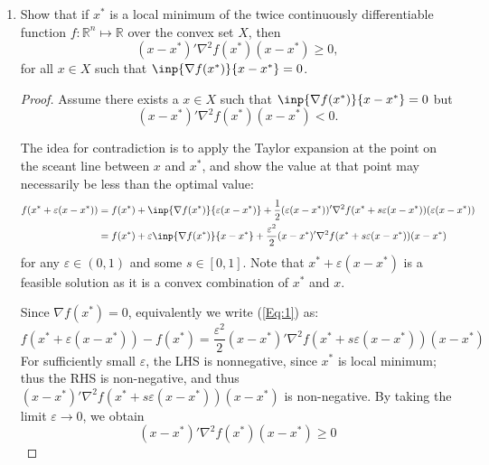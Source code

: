 \begin{enumerate}
\item
Show that if $x^*$ is a local minimum of the twice continuously differentiable function $f:\mathbb{R}^n\mapsto\mathbb{R}$ over the convex set $X$, then
\[
(x-x^*)'\nabla^2f(x^*)(x-x^*)\ge0,
\]
for all $x\in X$ such that $\inp{\nabla f(x^*)}{x-x^*}=0$.
\begin{proof}
Assume there exists a $x\in X$ such that $\inp{\nabla f(x^*)}{x-x^*}=0$ but 
\[
(x-x^*)'\nabla^2f(x^*)(x-x^*)<0.
\]

The idea for contradiction is to apply the Taylor expansion at the point on the sceant line between $x$ and $x^*$, and show the value at that point may necessarily be less than the optimal value:
\begin{equation}\label{Eq:1}
\begin{aligned}
f(x^*+\varepsilon(x-x^*))&=f(x^*)+\inp{\nabla f(x^*)}{\varepsilon(x-x^*)}+\frac{1}{2}(\varepsilon(x-x^*))'\nabla^2f(x^*+s\varepsilon(x-x^*))(\varepsilon(x-x^*))\\
&=f(x^*)+\varepsilon\inp{\nabla f(x^*)}{x-x^*}
+\frac{\varepsilon^2}{2}(x-x^*)'\nabla^2f(x^*+s\varepsilon(x-x^*))(x-x^*)
\end{aligned}
\end{equation}
for any $\varepsilon\in(0,1)$ and some $s\in[0,1]$. Note that $x^*+\varepsilon(x-x^*)$ is a feasible solution as it is a convex combination of $x^*$ and $x$.

Since $\nabla f(x^*)=0$, equivalently we write (\ref{Eq:1}) as:
\begin{equation}
\label{Eq:111}
f(x^*+\varepsilon(x-x^*))-f(x^*)=\frac{\varepsilon^2}{2}(x-x^*)'\nabla^2f(x^*+s\varepsilon(x-x^*))(x-x^*)
\end{equation}
For sufficiently small $\varepsilon$, the LHS is nonnegative, since $x^*$ is local minimum; thus the RHS is non-negative, and thus $(x-x^*)'\nabla^2f(x^*+s\varepsilon(x-x^*))(x-x^*)$ is non-negative. By taking the limit $\varepsilon\to0$, we obtain 
\[
(x-x^*)'\nabla^2f(x^*)(x-x^*)\ge0
\]



\end{proof}
\end{enumerate}
